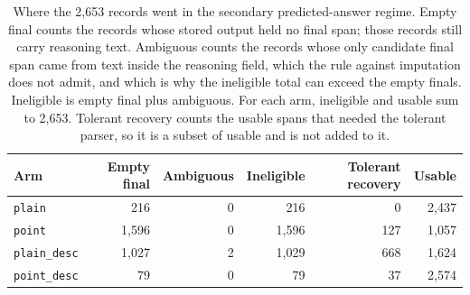 \begin{table}[ht]
\centering
\caption[Predicted-answer eligibility]{Where the 2,653 records went in the
secondary predicted-answer regime. Empty final counts the records whose stored
output held no final span; those records still carry reasoning text. Ambiguous
counts the records whose only candidate final span came from text inside the
reasoning field, which the rule against imputation does not admit, and which is
why the ineligible total can exceed the empty finals. Ineligible is empty final
plus ambiguous. For each arm, ineligible and
usable sum to 2,653. Tolerant recovery counts the usable spans that needed the
tolerant parser, so it is a subset of usable and is not added to it.}
\label{tab:app-pred-a-coverage}
\begin{tabular}{lrrrrr}
\toprule
Arm & Empty final & Ambiguous & Ineligible & Tolerant recovery & Usable \\
\midrule
\texttt{plain} & 216 & 0 & 216 & 0 & 2,437 \\
\texttt{point} & 1,596 & 0 & 1,596 & 127 & 1,057 \\
\texttt{plain\_desc} & 1,027 & 2 & 1,029 & 668 & 1,624 \\
\texttt{point\_desc} & 79 & 0 & 79 & 37 & 2,574 \\
\bottomrule
\end{tabular}
\end{table}

